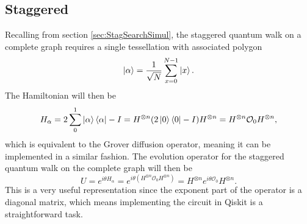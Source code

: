 \documentclass[../../dissertation.tex]{subfiles}
\begin{document}
\subsection{Staggered}
Recalling from section \ref{sec:StagSearchSimul}, the staggered quantum walk on
a complete graph requires a single tessellation with associated polygon
\begin{equation}
	\ket{\alpha} = \frac{1}{\sqrt{N}} \sum_{x=0}^{N-1} \ket{x}.
\end{equation}
The Hamiltonian will then be 
\begin{equation}
	H_\alpha = 2\sum_0^1\ket{\alpha}\bra{\alpha} - I = H^{\otimes n} (2\ket{0}\bra{0} - I) H^{\otimes n} = H^{\otimes n} \mathcal{O}_0 H^{\otimes n},
\end{equation}
which is equivalent to the Grover diffusion operator, meaning it can be
implemented in a similar fashion. The evolution operator for the staggered
quantum walk on the complete graph will then be 
\begin{equation}
	U = e^{i\theta H_\alpha} = e^{i\theta(H^{\otimes n} \mathcal{O}_0 H^{\otimes n})} = H^{\otimes n} e^{i\theta\mathcal{O}_0} H^{\otimes n}.
	\label{eq:unmodEvolOperatorStagSearch}
\end{equation}
This is a very useful representation since the exponent part of the operator is
a diagonal matrix, which means implementing the circuit in Qiskit is a
straightforward task.\par 
\end{document}
